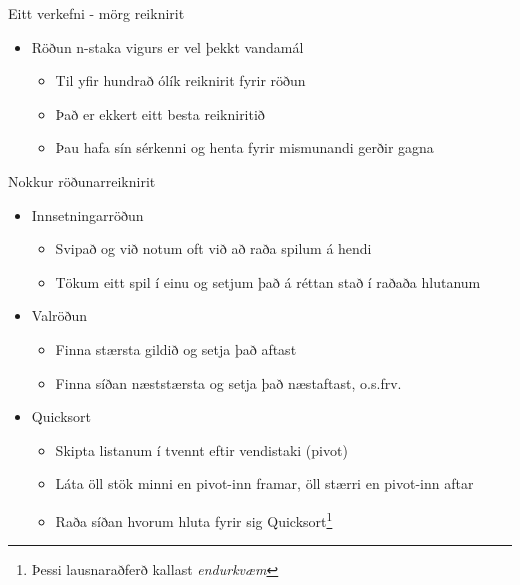 \documentclass{beamer}
\begin{document}
\begin{frame}{Eitt verkefni - mörg reiknirit}
\begin{itemize}
 \item Röðun n-staka vigurs er vel þekkt vandamál
 \begin{itemize}
  \item Til yfir hundrað ólík reiknirit fyrir röðun
  \item Það er ekkert eitt besta reikniritið
  \item Þau hafa sín sérkenni og henta fyrir mismunandi gerðir gagna
 \end{itemize}
\end{itemize}
\end{frame}

\begin{frame}{Nokkur röðunarreiknirit}
\begin{itemize}
 \item Innsetningarröðun
 \begin{itemize}
  \item Svipað og við notum oft við að raða spilum á hendi
  \item Tökum eitt spil í einu og setjum það á réttan stað í raðaða hlutanum
 \end{itemize}
 \item Valröðun
 \begin{itemize}
  \item Finna stærsta gildið og setja það aftast
  \item Finna síðan næststærsta og setja það næstaftast, o.s.frv.
 \end{itemize}
 \item Quicksort
 \begin{itemize}
  \item Skipta listanum í tvennt eftir vendistaki (pivot)
  \item Láta öll stök minni en pivot-inn framar, öll stærri en pivot-inn aftar
  \item Raða síðan hvorum hluta fyrir sig Quicksort\footnote{Þessi lausnaraðferð kallast \emph{endurkvæm}}
 \end{itemize}
\end{itemize}
\end{frame}
\end{document}
